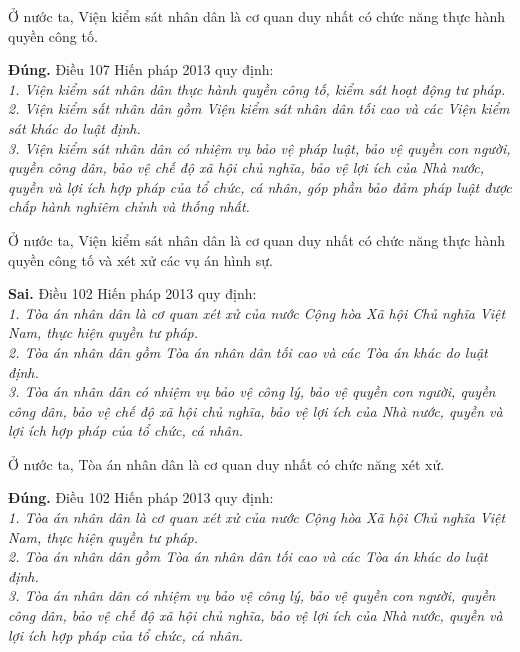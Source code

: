 \begin{ques}
Ở nước ta, Viện kiểm sát nhân dân là cơ quan duy nhất có chức năng thực hành quyền công tố.
\end{ques}
\begin{ans}
\textbf{Đúng.} Điều 107 Hiến pháp 2013 quy định:\\
\textit{1. Viện kiểm sát nhân dân thực hành quyền công tố, kiểm sát hoạt động tư pháp.}\\
\textit{2. Viện kiểm sất nhân dân gồm Viện kiểm sát nhân dân tối cao và các Viện kiểm sát khác do luật định.}\\
\textit{3. Viện kiểm sát nhân dân có nhiệm vụ bảo vệ pháp luật, bảo vệ quyền con người, quyền công dân, bảo vệ chế độ xã hội chủ nghĩa, bảo vệ lợi ích của Nhà nước, quyền và lợi ích hợp pháp của tổ chức, cá nhân, góp phần bảo đảm pháp luật được chấp hành nghiêm chỉnh và thống nhất.}
\end{ans}

\begin{ques}
Ở nước ta, Viện kiểm sát nhân dân là cơ quan duy nhất có chức năng thực hành quyền công tố và xét xử các vụ án hình sự.
\end{ques}
\begin{ans}
\textbf{Sai.} Điều 102 Hiến pháp 2013 quy định:\\
\textit{1. Tòa án nhân dân là cơ quan xét xử của nước Cộng hòa Xã hội Chủ nghĩa Việt Nam, thực hiện quyền tư pháp.} \\
\textit{2. Tòa án nhân dân gồm Tòa án nhân dân tối cao và các Tòa án khác do luật định.}\\
\textit{3. Tòa án nhân dân có nhiệm vụ bảo vệ công lý, bảo vệ quyền con người, quyền công dân, bảo vệ chế độ xã hội chủ nghĩa, bảo vệ lợi ích của Nhà nước, quyền và lợi ích hợp pháp của tổ chức, cá nhân.}
\end{ans} 

\begin{ques}
Ở nước ta, Tòa án nhân dân là cơ quan duy nhất có chức năng xét xử.
\end{ques}
\begin{ans}
\textbf{Đúng.} Điều 102 Hiến pháp 2013 quy định:\\
\textit{1. Tòa án nhân dân là cơ quan xét xử của nước Cộng hòa Xã hội Chủ nghĩa Việt Nam, thực hiện quyền tư pháp.} \\
\textit{2. Tòa án nhân dân gồm Tòa án nhân dân tối cao và các Tòa án khác do luật định.}\\
\textit{3. Tòa án nhân dân có nhiệm vụ bảo vệ công lý, bảo vệ quyền con người, quyền công dân, bảo vệ chế độ xã hội chủ nghĩa, bảo vệ lợi ích của Nhà nước, quyền và lợi ích hợp pháp của tổ chức, cá nhân.}
\end{ans}


